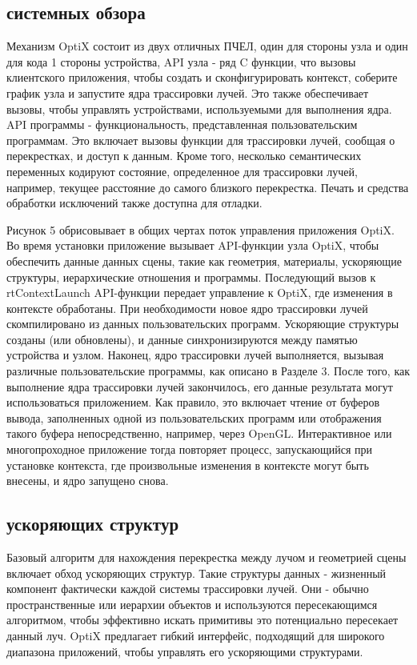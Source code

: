 \subsection{системных обзора}
Механизм OptiX состоит из двух отличных ПЧЕЛ, один для стороны узла и один для кода 1 стороны устройства, API узла - ряд C функции, что вызовы клиентского приложения, чтобы создать и сконфигурировать контекст, соберите график узла и запустите ядра трассировки лучей. Это также обеспечивает вызовы, чтобы управлять устройствами, используемыми для выполнения ядра. API программы - функциональность, представленная пользовательским программам. Это включает вызовы функции для трассировки лучей, сообщая о перекрестках, и доступ к данным. Кроме того, несколько семантических переменных кодируют состояние, определенное для трассировки лучей, например, текущее расстояние до самого близкого перекрестка.
Печать и средства обработки исключений также доступна для отладки.

Рисунок 5 обрисовывает в общих чертах поток управления приложения OptiX. Во время установки приложение вызывает API-функции узла OptiX, чтобы обеспечить данные данных сцены, такие как геометрия, материалы, ускоряющие структуры, иерархические отношения и программы. Последующий вызов к rtContextLaunch API-функции передает управление к OptiX, где изменения в контексте обработаны. При необходимости новое ядро трассировки лучей скомпилировано из данных пользовательских программ. Ускоряющие структуры созданы (или обновлены), и данные синхронизируются между памятью устройства и узлом. Наконец, ядро трассировки лучей выполняется, вызывая различные пользовательские программы, как описано в Разделе 3. После того, как выполнение ядра трассировки лучей закончилось, его данные результата могут использоваться приложением. Как правило, это включает чтение от буферов вывода, заполненных одной из пользовательских программ или отображения такого буфера непосредственно, например, через OpenGL. Интерактивное или многопроходное приложение тогда повторяет процесс, запускающийся при установке контекста, где произвольные изменения в контексте могут быть внесены, и ядро запущено снова.
\subsection{ускоряющих структур}
Базовый алгоритм для нахождения перекрестка между лучом и геометрией сцены включает обход ускоряющих структур. Такие структуры данных - жизненный компонент фактически каждой системы трассировки лучей. Они - обычно пространственные или иерархии объектов и используются пересекающимся алгоритмом, чтобы эффективно искать примитивы
это потенциально пересекает данный луч. OptiX предлагает гибкий интерфейс, подходящий для широкого диапазона приложений, чтобы управлять его ускоряющими структурами.
